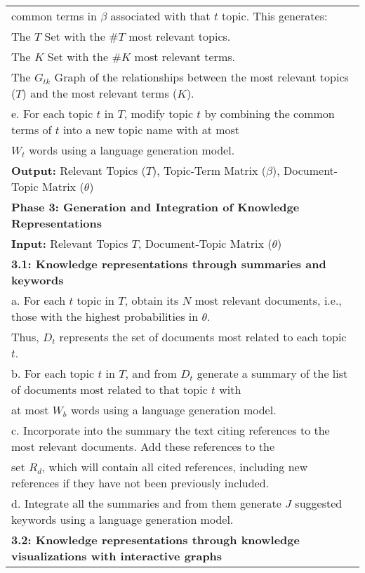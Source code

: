 \documentclass[runningheads]{llncs}
\begin{document}
\begin{figure*}[!h]
{\begin{tabular}{l}
			\quad \quad common terms in $\beta$ associated with that $t$ topic. This generates: \\
			\quad \quad The $T$ Set with the $\#T$ most relevant topics. \\
			\quad \quad The $K$ Set with the $\#K$ most relevant terms. \\
			\quad \quad The $G_{tk}$ Graph of the relationships between the most relevant topics ($T$) and the most relevant terms ($K$). \\
			\quad e. For each topic $t$ in $T$, modify topic $t$ by combining the common terms of $t$ into a new topic name with at most \\
			\quad \quad $W_{t}$ words using a language generation model.\\
			\quad \textbf{Output:} Relevant Topics ($T$), Topic-Term Matrix ($\beta$), Document-Topic Matrix ($\theta$) \\
			\textbf{Phase 3: Generation and Integration of Knowledge Representations} \\
			\quad \textbf{Input:} Relevant Topics $T$, Document-Topic Matrix ($\theta$) \\
			\quad \textbf{3.1: Knowledge representations through summaries and keywords}\\
			\quad \quad a. For each $t$ topic in $T$, obtain its $N$ most relevant documents, i.e., those with the highest probabilities in $\theta$. \\
			\quad \quad \quad Thus, $D_t$ represents the set of documents most related to each topic $t$.\\
			\quad \quad b. For each topic $t$ in $T$, and from $D_t$ generate a summary of the list of documents most related to that topic $t$ with \\
			\quad \quad \quad at most $W_b$ words using a language generation model. \\
			\quad \quad c. Incorporate into the summary the text citing references to the most relevant documents. Add these references to the \\ 
			\quad \quad \quad set $R_d$, which will contain all cited references, including new references if they have not been previously included.\\
			\quad \quad d. Integrate all the summaries and from them generate $J$ suggested keywords using a language generation model.\\
			\quad \textbf{3.2: Knowledge representations through knowledge visualizations with interactive graphs}\\

\end{tabular}}
\end{figure*}
\end{document}
